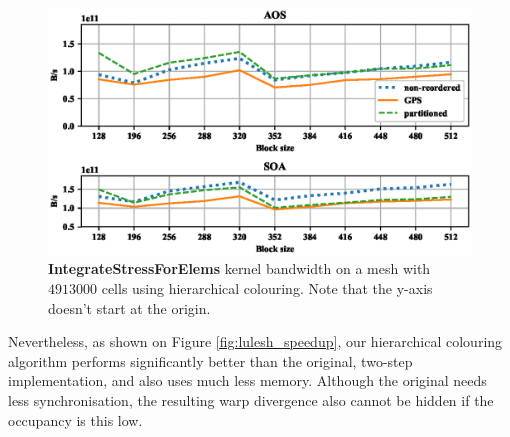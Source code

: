 \begin{figure}[Htbp]
  \centering
  \includegraphics[width=12cm]{fig/lulesh_bw-vs-bs_hier.eps}
  \caption{\textbf{IntegrateStressForElems} kernel bandwidth on a mesh with
  $4913000$ cells using hierarchical colouring. Note that the y-axis doesn't
  start at the origin.}
  \label{fig:lulesh_bw-vs-bs_hier}
\end{figure}

Nevertheless, as shown on Figure \ref{fig:lulesh_speedup}, our hierarchical
colouring algorithm performs significantly better than the original, two-step
implementation, and also uses much less memory. Although the original needs less
synchronisation, the resulting warp divergence also cannot be hidden if the
occupancy is this low.

